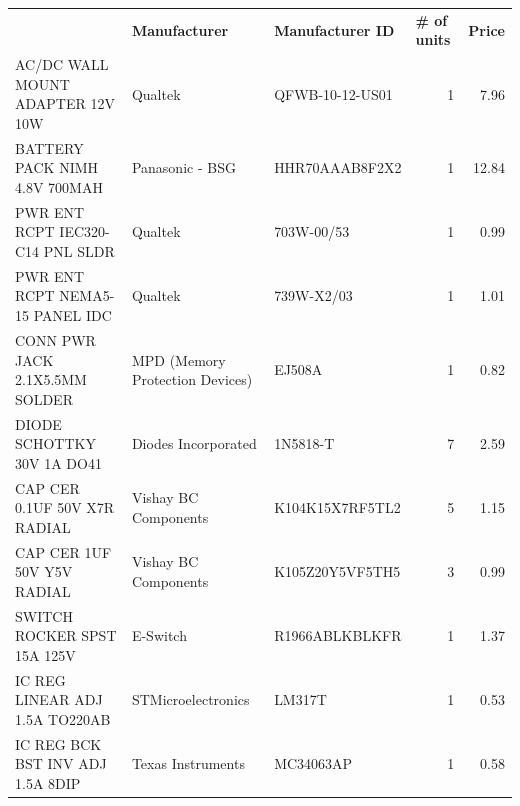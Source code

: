 \documentclass[journal,compsoc]{IEEEtran}
\begin{document}
\begin{table}[]
  \centering
   \begin{tabular}{|rrr|r|r|}
    \rowcolor[rgb]{ .663,  .816,  .557} \multicolumn{5}{|c|}{\textbf{Power Supply}} \\
    \midrule
    \rowcolor[rgb]{ .608,  .761,  .902} \multicolumn{1}{|l}{\textbf{Description}} & \multicolumn{1}{l}{\textbf{Manufacturer }} & \multicolumn{1}{l}{\textbf{Manufacturer ID}} & \multicolumn{1}{l}{\textbf{\# of units}} & \multicolumn{1}{l|}{\textbf{Price }} \\
    \multicolumn{1}{|l}{AC/DC WALL MOUNT ADAPTER 12V 10W} & \multicolumn{1}{l}{Qualtek} & \multicolumn{1}{l}{QFWB-10-12-US01} & \multicolumn{1}{r}{1} & 7.96 \\
    \multicolumn{1}{|l}{BATTERY PACK NIMH 4.8V 700MAH} & \multicolumn{1}{l}{Panasonic - BSG} & \multicolumn{1}{l}{HHR70AAAB8F2X2} & \multicolumn{1}{r}{1} & 12.84 \\
    \multicolumn{1}{|l}{PWR ENT RCPT IEC320-C14 PNL SLDR} & \multicolumn{1}{l}{Qualtek} & \multicolumn{1}{l}{703W-00/53} & \multicolumn{1}{r}{1} & 0.99 \\
    \multicolumn{1}{|l}{PWR ENT RCPT NEMA5-15 PANEL IDC} & \multicolumn{1}{l}{Qualtek} & \multicolumn{1}{l}{739W-X2/03} & \multicolumn{1}{r}{1} & 1.01 \\
    \multicolumn{1}{|l}{CONN PWR JACK 2.1X5.5MM SOLDER} & \multicolumn{1}{l}{MPD (Memory Protection Devices)} & \multicolumn{1}{l}{EJ508A} & \multicolumn{1}{r}{1} & 0.82 \\
    \multicolumn{1}{|l}{DIODE SCHOTTKY 30V 1A DO41} & \multicolumn{1}{l}{Diodes Incorporated} & \multicolumn{1}{l}{1N5818-T} & \multicolumn{1}{r}{7} & 2.59 \\
    \multicolumn{1}{|l}{CAP CER 0.1UF 50V X7R RADIAL} & \multicolumn{1}{l}{Vishay BC Components} & \multicolumn{1}{l}{K104K15X7RF5TL2} & \multicolumn{1}{r}{5} & 1.15 \\
    \multicolumn{1}{|l}{CAP CER 1UF 50V Y5V RADIAL} & \multicolumn{1}{l}{Vishay BC Components} & \multicolumn{1}{l}{K105Z20Y5VF5TH5} & \multicolumn{1}{r}{3} & 0.99 \\
    \multicolumn{1}{|l}{SWITCH ROCKER SPST 15A 125V} & \multicolumn{1}{l}{E-Switch} & \multicolumn{1}{l}{R1966ABLKBLKFR} & \multicolumn{1}{r}{1} & 1.37 \\
    \multicolumn{1}{|l}{IC REG LINEAR ADJ 1.5A TO220AB} & \multicolumn{1}{l}{STMicroelectronics} & \multicolumn{1}{l}{LM317T} & \multicolumn{1}{r}{1} & 0.53 \\
    \multicolumn{1}{|l}{IC REG BCK BST INV ADJ 1.5A 8DIP} & \multicolumn{1}{l}{Texas Instruments} & \multicolumn{1}{l}{MC34063AP} & \multicolumn{1}{r}{1} & 0.58 \\

\end{tabular}
\end{table}
\end{document}
